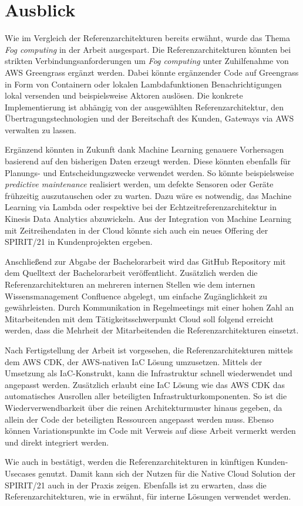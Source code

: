 \section{Ausblick}\label{section:Ausblick}
Wie im Vergleich der Referenzarchitekturen bereits erwähnt, wurde das Thema \textit{Fog computing} in der Arbeit ausgespart. Die Referenzarchitekturen könnten bei strikten Verbindungsanforderungen um \textit{Fog computing} unter Zuhilfenahme von \ac{AWS} Greengrass ergänzt werden. Dabei könnte ergänzender Code auf Greengrass in Form von Containern oder lokalen Lambdafunktionen Benachrichtigungen lokal versenden und beispielsweise Aktoren auslösen. Die konkrete Implementierung ist abhängig von der ausgewählten Referenzarchitektur, den Übertragungstechnologien und der Bereitschaft des Kunden, Gateways via \ac{AWS} verwalten zu lassen.

Ergänzend könnten in Zukunft dank Machine Learning genauere Vorhersagen basierend auf den bisherigen Daten erzeugt werden. Diese könnten ebenfalls für Planungs- und Entscheidungszwecke verwendet werden. So könnte beispielsweise \textit{predictive maintenance} realisiert werden, um defekte Sensoren oder Geräte frühzeitig auszutauschen oder zu warten. Dazu wäre es notwendig, das Machine Learning via Lambda oder respektive bei der Echtzeitreferenzarchitektur in Kinesis Data Analytics abzuwickeln. Aus der Integration von Machine Learning mit Zeitreihendaten in der Cloud könnte sich auch ein neues Offering der SPIRIT/21 in Kundenprojekten ergeben.

Anschließend zur Abgabe der Bachelorarbeit wird das GitHub Repository mit dem Quelltext der Bachelorarbeit veröffentlicht. Zusätzlich werden die Referenzarchitekturen an mehreren internen Stellen wie dem internen Wissensmanagement Confluence abgelegt, um einfache Zugänglichkeit zu gewährleisten. Durch Kommunikation in Regelmeetings mit einer hohen Zahl an Mitarbeitenden mit dem Tätigkeitsschwerpunkt Cloud soll folgend erreicht werden, dass die Mehrheit der Mitarbeitenden die Referenzarchitekturen einsetzt. 

Nach Fertigstellung der Arbeit ist vorgesehen, die Referenzarchitekturen mittels dem \ac{AWS} \ac{CDK}, der \ac{AWS}-nativen \ac{IaC} Lösung umzusetzen. Mittels der Umsetzung als \ac{IaC}-Konstrukt, kann die Infrastruktur schnell wiederwendet und angepasst werden. Zusätzlich erlaubt eine \ac{IaC} Lösung wie das \ac{AWS} \ac{CDK} das automatisches Ausrollen aller beteiligten Infrastrukturkomponenten. So ist die Wiederverwendbarkeit über die reinen Architekturmuster hinaus gegeben, da allein der Code der beteiligten Ressourcen angepasst werden muss. Ebenso können Variationspunkte im Code mit Verweis auf diese Arbeit vermerkt werden und direkt integriert werden.

Wie auch in  bestätigt, werden die Referenzarchitekturen in künftigen Kunden-Usecases genutzt. Damit kann sich der Nutzen für die Native Cloud Solution der SPIRIT/21 auch in der Praxis zeigen. Ebenfalls ist zu erwarten, dass die Referenzarchitekturen, wie in  erwähnt, für interne Lösungen verwendet werden.